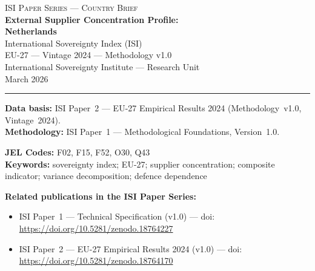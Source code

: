\documentclass[12pt,a4paper]{article}
\begin{document}
\hypersetup{pageanchor=false}

\begin{titlepage}
\centering
\vspace*{2cm}
{\Large\textsc{ISI Paper Series --- Country Brief}}\\[1.2cm]
{\LARGE\bfseries External Supplier Concentration Profile:\\[0.3em]
Netherlands}\\[1.5cm]
{\large International Sovereignty Index (ISI)\\[0.3em]
EU-27 --- Vintage 2024 --- Methodology v1.0}\\[1.2cm]
{\large International Sovereignty Institute --- Research Unit}\\[0.8cm]
{\large March 2026}

\vspace{0.8cm}
\noindent\rule{\textwidth}{0.4pt}
\vspace{0.4cm}

\begin{flushleft}
\noindent\textbf{Data basis:} ISI Paper~2 --- EU-27 Empirical Results 2024 (Methodology~v1.0, Vintage~2024).\\[4pt]
\noindent\textbf{Methodology:} ISI Paper~1 --- Methodological Foundations, Version~1.0.

\medskip

\noindent\textbf{JEL Codes:} F02, F15, F52, O30, Q43\\[4pt]
\noindent\textbf{Keywords:} sovereignty index; EU-27; supplier concentration; composite indicator; variance decomposition; defence dependence

\medskip

\noindent\textbf{Related publications in the ISI Paper Series:}
\begin{itemize}[nosep,leftmargin=1.5em]
\item ISI Paper~1 --- Technical Specification (v1.0) --- doi:\\
  \url{https://doi.org/10.5281/zenodo.18764227}
\item ISI Paper~2 --- EU-27 Empirical Results 2024 (v1.0) --- doi:\\
  \url{https://doi.org/10.5281/zenodo.18764170}
\end{itemize}
\end{flushleft}
\vfill
\end{titlepage}
\end{document}
